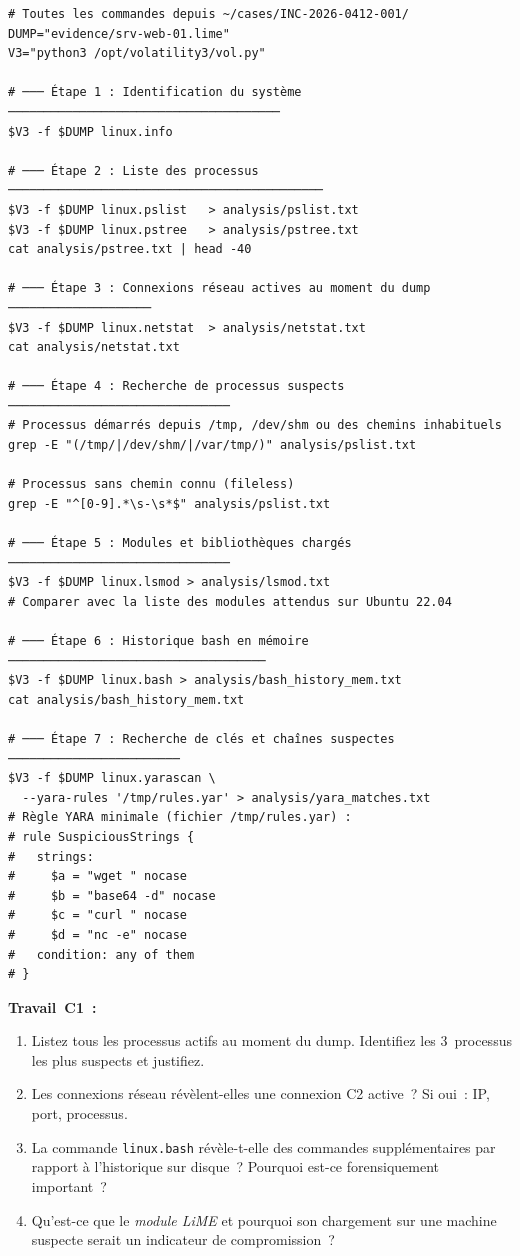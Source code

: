 \begin{lstlisting}[style=StyleTerminal,
  caption={Analyse du dump mémoire srv-web-01 avec Volatility~3},
  label={lst:lab2-volatility}]
# Toutes les commandes depuis ~/cases/INC-2026-0412-001/
DUMP="evidence/srv-web-01.lime"
V3="python3 /opt/volatility3/vol.py"

# ─── Étape 1 : Identification du système ──────────────────────────────────────
$V3 -f $DUMP linux.info

# ─── Étape 2 : Liste des processus ────────────────────────────────────────────
$V3 -f $DUMP linux.pslist   > analysis/pslist.txt
$V3 -f $DUMP linux.pstree   > analysis/pstree.txt
cat analysis/pstree.txt | head -40

# ─── Étape 3 : Connexions réseau actives au moment du dump ────────────────────
$V3 -f $DUMP linux.netstat  > analysis/netstat.txt
cat analysis/netstat.txt

# ─── Étape 4 : Recherche de processus suspects ───────────────────────────────
# Processus démarrés depuis /tmp, /dev/shm ou des chemins inhabituels
grep -E "(/tmp/|/dev/shm/|/var/tmp/)" analysis/pslist.txt

# Processus sans chemin connu (fileless)
grep -E "^[0-9].*\s-\s*$" analysis/pslist.txt

# ─── Étape 5 : Modules et bibliothèques chargés ───────────────────────────────
$V3 -f $DUMP linux.lsmod > analysis/lsmod.txt
# Comparer avec la liste des modules attendus sur Ubuntu 22.04

# ─── Étape 6 : Historique bash en mémoire ────────────────────────────────────
$V3 -f $DUMP linux.bash > analysis/bash_history_mem.txt
cat analysis/bash_history_mem.txt

# ─── Étape 7 : Recherche de clés et chaînes suspectes ────────────────────────
$V3 -f $DUMP linux.yarascan \
  --yara-rules '/tmp/rules.yar' > analysis/yara_matches.txt
# Règle YARA minimale (fichier /tmp/rules.yar) :
# rule SuspiciousStrings {
#   strings:
#     $a = "wget " nocase
#     $b = "base64 -d" nocase
#     $c = "curl " nocase
#     $d = "nc -e" nocase
#   condition: any of them
# }
\end{lstlisting}

\begin{boxexo}
\textbf{Travail~C1~:}
\begin{enumerate}
  \item Listez tous les processus actifs au moment du dump.
        Identifiez les 3~processus les plus suspects et justifiez.
  \item Les connexions réseau révèlent-elles une connexion C2 active~?
        Si oui~: IP, port, processus.
  \item La commande \texttt{linux.bash} révèle-t-elle des commandes
        supplémentaires par rapport à l'historique sur disque~?
        Pourquoi est-ce forensiquement important~?
  \item Qu'est-ce que le \textit{module LiME} et pourquoi son
        chargement sur une machine suspecte serait un indicateur
        de compromission~?
\end{enumerate}
\end{boxexo}


